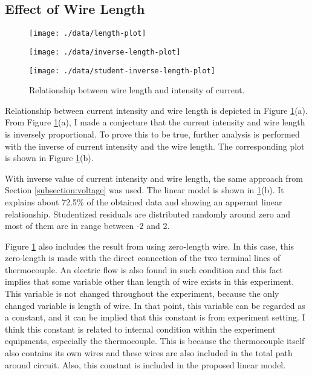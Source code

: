 \subsection{Effect of Wire Length}

\begin{figure}[!t]
  \centering
  \begin{subfloat}
    {
      \texttt{[image: ./data/length-plot]}
    }
  \end{subfloat}

  \begin{subfloat}[][Inverse of wire length-current data and linear regression model: $\frac{1}{y} = 0.0203x + 0.0416, R^2 = 0.725$. $y$ denotes current, $x$ denotes wire length in meters.]
    {
      \texttt{[image: ./data/inverse-length-plot]}
    }
  \end{subfloat}

  \hfill

  \begin{subfloat}
    {
      \texttt{[image: ./data/student-inverse-length-plot]}
    }
  \end{subfloat}

  \caption{Relationship between wire length and intensity of current.}
  \label{plot:length-current}
\end{figure}

Relationship between current intensity and wire length is depicted in Figure \ref{plot:length-current}(a).
From Figure \ref{plot:length-current}(a), I made a conjecture that the current intensity and wire length is inversely proportional.
To prove this to be true, further analysis is performed with the inverse of current intensity and the wire length.
The corresponding plot is shown in Figure \ref{plot:length-current}(b).

With inverse value of current intensity and wire length, the same approach from Section \ref{subsection:voltage} was used.
The linear model is shown in \ref{plot:length-current}(b).
It explains about 72.5\% of the obtained data and showing an apperant linear relationship.
Studentized residuals are distributed randomly around zero and most of them are in range between -2 and 2.

Figure \ref{plot:length-current} also includes the result from using zero-length wire.
In this case, this zero-length is made with the direct connection of the two terminal lines of thermocouple.
An electric flow is also found in such condition and this fact implies that some variable other than length of wire exists in this experiment.
This variable is not changed throughout the experiment, because the only changed variable is length of wire.
In that point, this variable can be regarded as a constant, and it can be implied that this constant is from experiment setting.
I think this constant is related to internal condition within the experiment equipments, especially the thermocouple.
This is because the thermocouple itself also contains its own wires and these wires are also included in the total path around circuit.
Also, this constant is included in the proposed linear model.

